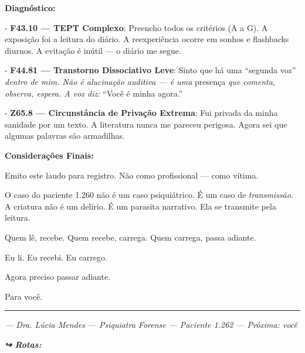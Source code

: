 \noindent \textbf{Diagnóstico:}

\noindent - \textbf{F43.10 --- TEPT Complexo}: Preencho todos os critérios (A a G). A exposição foi a leitura do diário. A reexperiência ocorre em sonhos e flashbacks diurnos. A evitação é inútil --- o diário me segue.

\noindent - \textbf{F44.81 --- Transtorno Dissociativo Leve}: Sinto que há uma \textquotedblleft{}segunda voz\textquotedblright{\textit{ dentro de mim. Não é alucinação auditiva --- é uma }presença\textit{ que comenta, observa, espera. A voz diz: }\textquotedblleft{}Você é minha agora.\textquotedblright{}}

\noindent - \textbf{Z65.8 --- Circunstância de Privação Extrema}: Fui privada da minha sanidade por um texto. A literatura nunca me pareceu perigosa. Agora sei que algumas palavras são armadilhas.

\noindent \textbf{Considerações Finais:}

\noindent Emito este laudo para registro. Não como profissional --- como vítima.

\noindent O caso do paciente 1.260 não é um caso psiquiátrico. É um caso de \textit{transmissão}. A criatura não é um delírio. É um parasita narrativo. Ela se transmite pela leitura.

\noindent Quem lê, recebe.
Quem recebe, carrega.
Quem carrega, passa adiante.

\noindent Eu li.
Eu recebi.
Eu carrego.

\noindent Agora preciso passar adiante.

\noindent Para você.

\vspace{0.5em}\noindent\rule{\textwidth}{0.5pt}\vspace{0.5em}

\noindent \textit{--- Dra. Lúcia Mendes}
\textit{--- Psiquiatra Forense}
\textit{--- Paciente 1.262}
\textit{--- Próxima: você}

\vspace{0.5em}
\noindent\textit{\textbf{↪ Rotas:}  \rotasep {}}